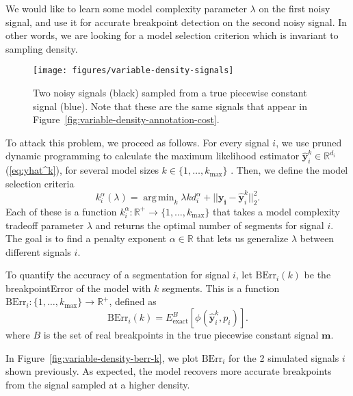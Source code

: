 \documentclass{jsfds} %
\DeclareMathOperator*{\argmin}{arg\,min}
\newcommand{\RR}{\mathbb{R}}
\begin{document}
We would like to learn some model complexity parameter $\lambda$ on
the first noisy signal, and use it for accurate breakpoint detection
on the second noisy signal. In other words, we are looking for a model
selection criterion which is invariant to sampling density. 

\begin{figure}[H]
\texttt{[image: figures/variable-density-signals]}
%
\vskip -0.3cm
  \caption{Two noisy signals (black) sampled from
  a true piecewise constant signal (blue). Note that these are the
  same signals that appear in
  Figure~\ref{fig:variable-density-annotation-cost}.}
\label{fig:variable-density-signals}
\end{figure}

\newpage


To attack this problem, we proceed as follows. For every signal $i$,
we use pruned dynamic programming to calculate the maximum likelihood
estimator $\mathbf{\hat y}^k_i\in\RR^{d_i}$ (\ref{eq:yhat^k}), for several model sizes
$k\in\{1,\dots,k_{\text{max}}\}$ \citep{pruned-dp}. Then, we define
the model selection criteria
\begin{equation}
  \label{eq:kstar_density}
  k^\alpha_i(\lambda) =\argmin_k \lambda k d_i^\alpha + 
  ||\mathbf{y_i}-\mathbf{\hat y}^k_i||_2^2.
\end{equation}
Each of these is a function $k_i^\alpha:\RR^+\rightarrow
\{1,\dots,k_{\text{max}}\}$ that takes a model complexity tradeoff
parameter $\lambda$ and returns the optimal number of segments for
signal $i$. The goal is to find a penalty exponent $\alpha\in\RR$ that
lets us generalize $\lambda$ between different signals $i$.


To quantify the accuracy of a segmentation for signal $i$, let
$\text{BErr}_i(k)$ be the breakpointError of the model with
$k$ segments. This is a function
$\text{BErr}_i:\{1,\dots,k_{\text{max}}\}\rightarrow\RR^+$, defined as
\begin{equation}
  \label{eq:berr}
  \text{BErr}_i(k) = E_{\text{exact}}^{B}\left[
\phi(\mathbf{\hat y}_i^k,p_i)
\right].
\end{equation}
where $B$ is the set of real breakpoints in the true piecewise constant
signal $\mathbf m$.

In Figure~\ref{fig:variable-density-berr-k}, we plot $\text{BErr}_i$
for the 2 simulated signals $i$ shown previously.  As expected, the
model recovers more accurate breakpoints from the signal sampled at a
higher density.  
\end{document}
